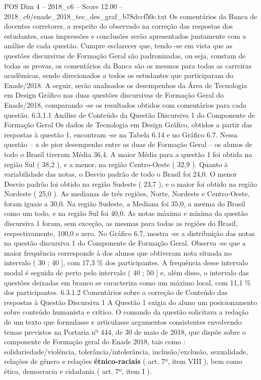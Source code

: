 \begin{textsample}{POS Dim 4 – 2018\_c6 – Score 12.00 – 2018\_c6/enade\_2018\_tec\_des\_graf\_b78dccf50c.txt}
Os comentários da Banca de docentes corretores, a respeito do observado na correção das respostas dos estudantes, suas impressões e conclusões serão apresentados juntamente com a análise de cada questão.
Cumpre esclarecer que, tendo -se em vista que as questões discursivas de Formação Geral são padronizadas, ou seja, constam de todas as provas, os comentários da Banca são os mesmos para todas as carreiras acadêmicas, sendo direcionados a todos os estudantes que participaram do Enade/2018.
A seguir, serão analisados os desempenhos da Área de Tecnologia em Design Gráfico nas duas questões discursivas de Formação Geral do Enade/2018, comparando -se os resultados obtidos com comentários para cada questão. 6.3.1.1 Análise de Conteúdo da Questão Discursiva 1 do Componente de Formação Geral Os dados de Tecnologia em Design Gráfico, obtidos a partir das respostas à questão 1, encontram -se na Tabela 6.14 e no Gráfico 6.7.
Nessa questão – a de pior desempenho entre as duas de Formação Geral – os alunos de todo o Brasil tiveram Média 36,4.
A maior Média para a questão 1 foi obtida na região Sul ( 38,2 ), e a menor, na região Centro-Oeste ( 32,9 ).
Quanto à variabilidade das notas, o Desvio padrão de todo o Brasil foi 24,0.
O menor Desvio padrão foi obtido na região Sudeste ( 23,7 ), e o maior foi obtido na região Nordeste ( 25,0 ).
As medianas de três regiões, Norte, Nordeste e Centro-Oeste, foram iguais a 30,0.
Na região Sudeste, a Mediana foi 35,0, a mesma do Brasil como um todo, e na região Sul foi 40,0.
As notas máxima e mínima da questão discursiva 1 foram, sem exceção, as mesmas para todas as regiões do Brasil, respectivamente, 100,0 e zero.
No Gráfico 6.7, mostra -se a distribuição das notas na questão discursiva 1 do Componente de Formação Geral.
Observa -se que a maior frequência corresponde à dos alunos que obtiveram nota situada no intervalo ( 30 ; 40 ], com 17,3 \% dos participantes.
A frequência desse intervalo modal é seguida de perto pelo intervalo ( 40 ; 50 ] e, além disso, o intervalo das questões deixadas em branco se caracteriza como um máximo local, com 11,1 \% dos participantes. 6.3.1.2 Comentários sobre a correção de Conteúdo das respostas à Questão Discursiva 1 A Questão 1 exigia do aluno um posicionamento sobre conteúdo humanista e crítico.
O comando da questão solicitava a redação de um texto que formulasse e articulasse argumentos consistentes envolvendo temas previstos na Portaria nº 444, de 30 de maio de 2018, que dispõe sobre o componente de Formação geral do Enade 2018, tais como : solidariedade/violência, tolerância/intolerância, inclusão/exclusão, sexualidade, relações de gênero e relações \textbf{étnico-raciais} ( art. 7º, item VIII ), bem como ética, democracia e cidadania ( art. 7º, item I ).

\end{textsample}
